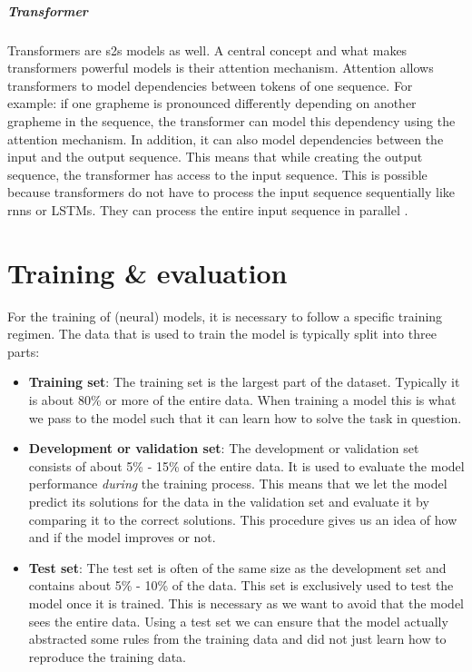 \subparagraph{Transformer}
Transformers are \ac{s2s} models as well. A central concept and what makes transformers powerful models is their attention mechanism. Attention allows transformers to model dependencies between tokens of one sequence. For example: if one grapheme is pronounced differently depending on another grapheme in the sequence, the transformer can model this dependency using the attention mechanism. In addition, it can also model dependencies between the input and the output sequence. This means that while creating the output sequence, the transformer has access to the input sequence. This is possible because transformers do not have to process the input sequence sequentially like \acp{rnn} or LSTMs. They can process the entire input sequence in parallel  \citep{Alammar.03.01.2022}.


\section{Training \& evaluation}
\label{sec:train-eval}
For the training of (neural) models, it is necessary to follow a specific training regimen. The data that is used to train the model is typically split into three parts:
\begin{itemize}
    \item \textbf{Training set}: The training set is the largest part of the dataset. Typically it is about 80\% or more of the entire data. When training a model this is what we pass to the model such that it can learn how to solve the task in question.
    \item \textbf{Development or validation set}: The development or validation set consists of about 5\% - 15\% of the entire data. It is used to evaluate the model performance \textit{during} the training process. This means that we let the model predict its solutions for the data in the validation set and evaluate it by comparing it to the correct solutions. This procedure gives us an idea of how and if the model improves or not.
    \item \textbf{Test set}: The test set is often of the same size as the development set and contains about 5\% - 10\% of the data. This set is exclusively used to test the model once it is trained. This is necessary as we want to avoid that the model sees the entire data. Using a test set we can ensure that the model actually abstracted some rules from the training data and did not just learn how to reproduce the training data.
\end{itemize}

